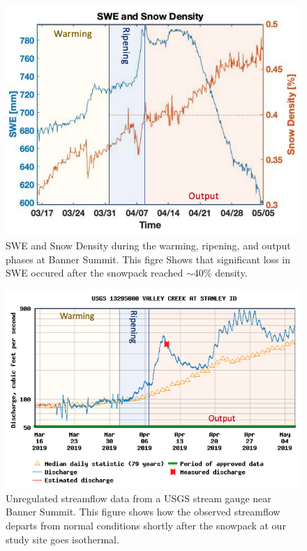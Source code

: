   \begin{figure}
    \centering
    \includegraphics[width=0.8\linewidth]{figures/RunoffTiming/SWE_Density.png}
    \caption{SWE and Snow Density during the warming, ripening, and output phases at Banner Summit. This figre Shows that significant loss in SWE occured after the snowpack reached $\sim$40\% density.}
    \label{fig:SWE_Density}
 \end{figure}

\begin{figure}
    \centering
    \includegraphics[width=1\linewidth]{figures/RunoffTiming/HydrographPhases.png}
    \caption{Unregulated streamflow data from a USGS stream gauge near Banner Summit. This figure shows how the observed streamflow departs from normal conditions shortly after the snowpack at our study site goes isothermal.}
    \label{fig:HydrographPhases}
 \end{figure}


